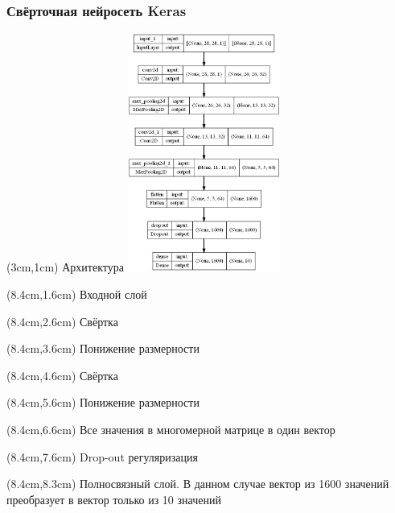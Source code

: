\documentclass{beamer}
\begin{document}
\begin{frame}
\frametitle{Свёрточная нейросеть Keras}

\begin{textblock*}{5cm}(3cm,1cm)
\tiny Архитектура
\includegraphics[width=5cm]{model_plot}
\end{textblock*}

\begin{textblock*}{4cm}(8.4cm,1.6cm)
\tiny Входной слой
\end{textblock*}

\begin{textblock*}{4cm}(8.4cm,2.6cm)
\tiny Свёртка
\end{textblock*}

\begin{textblock*}{4cm}(8.4cm,3.6cm)
\tiny Понижение размерности
\end{textblock*}

\begin{textblock*}{4cm}(8.4cm,4.6cm)
\tiny Свёртка
\end{textblock*}

\begin{textblock*}{4cm}(8.4cm,5.6cm)
\tiny Понижение размерности
\end{textblock*}

\begin{textblock*}{4cm}(8.4cm,6.6cm)
\tiny Все значения в многомерной матрице в один вектор
\end{textblock*}

\begin{textblock*}{4cm}(8.4cm,7.6cm)
\tiny Drop-out регуляризация
\end{textblock*}

\begin{textblock*}{4cm}(8.4cm,8.3cm)
\tiny Полносвязный слой. В данном случае вектор из 1600 значений преобразует в вектор только из 10 значений
\end{textblock*}

\end{frame}
\end{document}

